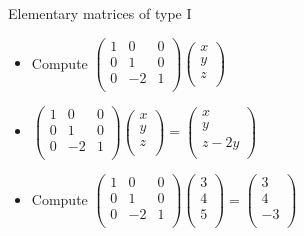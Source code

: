 \documentclass{beamer}
\begin{document}
\begin{frame}{Elementary matrices of type I}

\begin{itemize}
\item Compute $
\begin{pmatrix}
1 & 0 & 0 \\
0 & 1 & 0 \\
0 & -2 & 1 \\
\end{pmatrix}
\begin{pmatrix}
x \\
y \\
z  \\
\end{pmatrix}
$
\item
$
\begin{pmatrix}
1 & 0 & 0 \\
0 & 1 & 0 \\
0 & -2 & 1 \\
\end{pmatrix}
\begin{pmatrix}
x \\
y \\
z  \\
\end{pmatrix}
=
\begin{pmatrix}
x \\
y \\
z -2y \\
\end{pmatrix}
$
\item Compute $
\begin{pmatrix}
1 & 0 & 0 \\
0 & 1 & 0 \\
0 & -2 & 1 \\
\end{pmatrix}
\begin{pmatrix}
3 \\
4 \\
5  \\
\end{pmatrix}
=
\begin{pmatrix}
3 \\
4 \\
-3 \\
\end{pmatrix}
$

\end{itemize}
\end{frame}
\end{document}
